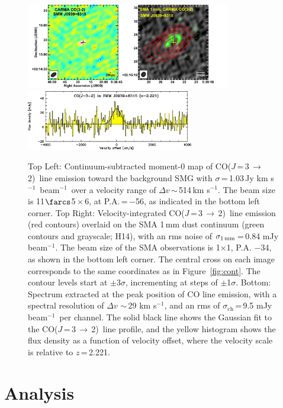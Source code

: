 \documentclass[twocolumn,apj,numberedappendix]{emulateapj}
\newcommand{\CO}{\mbox{CO($J$\,=\,3\,$\rightarrow$\,2) }}
\newcommand{\pmOne}{\mbox{$^{-1}$}}
\begin{document}
\begin{figure}[tbph] 
\centering
\includegraphics[width=0.8\textwidth]{Figure/LinePanel.pdf}
\includegraphics[width=0.65\textwidth]{Figure/smmj0939-co32_spec.eps}
\caption{Top Left: Continuum-subtracted moment-0 map of \CO line emission toward 
the background SMG with $\sigma$\,=\,1.03\,Jy\,\,km\,\,s\pmOne\ beam\pmOne\ over a velocity range of $\Delta v$\,$\sim$\,514\,km\,\,s\pmOne. The beam size is 11$\farcs$5\,$\times$\,6, at P.A.\,=\,$-$56\degr, as indicated in the bottom left corner. 
Top Right: Velocity-integrated \CO line emission (red contours) overlaid on the SMA 1\,mm dust continuum (green contours and grayscale; H14), with an rms noise of $\sigma_\textrm{1\,mm}$\,=\,0.84 mJy beam\pmOne. The beam size of the SMA observations is 1$ \times $1, P.A. $-$34\degr, as shown 
in the bottom left corner. 
The central cross on each image corresponds to the same coordinates as in Figure~\ref{fig:cont}. The contour levels start at $\pm$3$\sigma$, incrementing at
steps of $\pm$1$\sigma$. 
Bottom: 
Spectrum extracted at the peak position of CO line emission, with a spectral resolution of $\Delta v$ $\sim$\,29 km\,\,s\pmOne, and an rms of $\sigma_\textrm{ch}$\,=\,9.5 mJy beam\pmOne\ per channel. The
solid black line shows the Gaussian fit to the \CO line profile, and the yellow histogram shows the 
flux density as a function of velocity offset, where the velocity scale is relative to $z$\,=\,2.221. 
\label{fig:mom0}}
\end{figure}


\section{Analysis}
\end{document}
